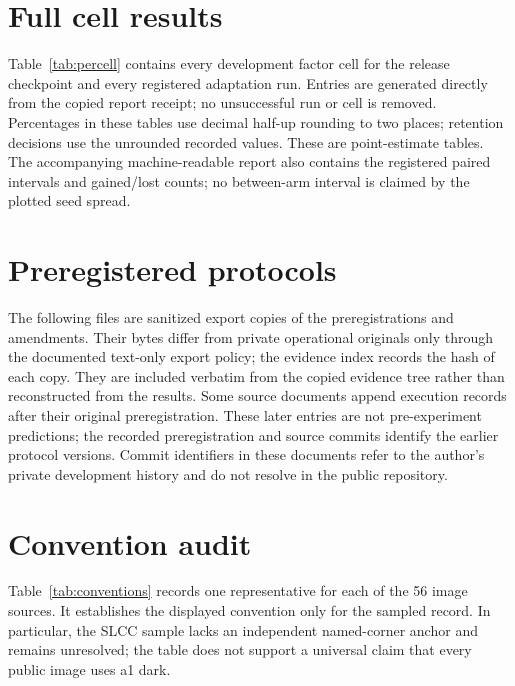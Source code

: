 \section{Full cell results}
\label{app:cells}

Table~\ref{tab:percell} contains every development factor cell for the
release checkpoint and every registered adaptation run. Entries are generated
directly from the copied report receipt; no unsuccessful run or cell is removed.
Percentages in these tables use decimal half-up rounding to two places;
retention decisions use the unrounded recorded values. These are point-estimate tables. The accompanying machine-readable report also
contains the registered paired intervals and gained/lost counts; no between-arm
interval is claimed by the plotted seed spread.



\clearpage
\section{Preregistered protocols}
\label{app:protocols}

The following files are sanitized export copies of the preregistrations and
amendments. Their bytes differ from private operational originals only through
the documented text-only export policy; the evidence index records the hash of
each copy. They are included verbatim from the copied evidence tree rather
than reconstructed from the results. Some source documents append execution
records after their original preregistration. These later entries are not
pre-experiment predictions; the recorded preregistration and source commits
identify the earlier protocol versions.
Commit identifiers in these documents refer to the author's private development history and
do not resolve in the public repository.



\clearpage
\section{Convention audit}
\label{app:conventions}

Table~\ref{tab:conventions} records one representative for each of the 56 image sources.
It establishes the displayed convention only for the sampled record. In
particular, the SLCC sample lacks an independent named-corner anchor and remains
unresolved; the table does not support a universal claim that every public image
uses a1 dark.

